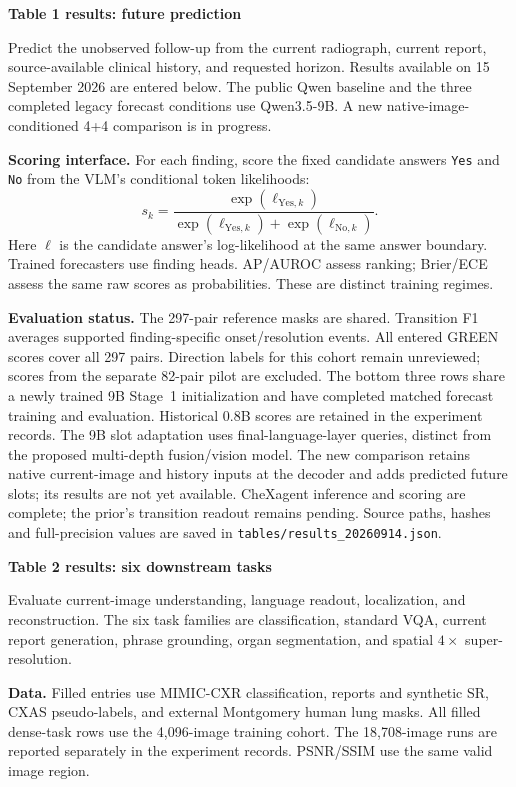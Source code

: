 \documentclass[10pt,letterpaper]{article}
\begin{document}
{\Large\bfseries Table 1 results: future prediction}\par
Predict the unobserved follow-up from the current radiograph, current report,
source-available clinical history, and requested horizon. Results available on
15 September 2026 are entered below. The public Qwen baseline and the three
completed legacy forecast conditions use Qwen3.5-9B. A new native-image-conditioned 4+4 comparison is in progress.



\textbf{Scoring interface.}
For each finding, score the fixed candidate answers \texttt{Yes} and \texttt{No}
from the VLM's conditional token likelihoods:
\[
 s_k=\frac{\exp(\ell_{\mathrm{Yes},k})}
 {\exp(\ell_{\mathrm{Yes},k})+\exp(\ell_{\mathrm{No},k})}.
\]
Here $\ell$ is the candidate answer's log-likelihood at the same answer boundary.
Trained forecasters use finding heads. AP/AUROC assess ranking; Brier/ECE assess
the same raw scores as probabilities. These are distinct training regimes.

\textbf{Evaluation status.}
The 297-pair reference masks are shared. Transition F1 averages supported
finding-specific onset/resolution events. All entered GREEN scores cover all
297 pairs. Direction labels for this cohort remain unreviewed; scores from the
separate 82-pair pilot are excluded. The bottom three rows share a newly trained
9B Stage~1 initialization and have completed matched forecast training and
evaluation. Historical 0.8B scores are retained in the experiment records.
The 9B slot adaptation
uses final-language-layer queries, distinct from the proposed multi-depth
fusion/vision model. The new comparison retains native current-image and history inputs at the decoder and adds predicted future slots; its results are not yet available. CheXagent inference and scoring are complete; the prior's
transition readout remains pending. Source paths, hashes and full-precision values are saved in
\texttt{tables/results\_20260914.json}.

\clearpage
{\Large\bfseries Table 2 results: six downstream tasks}\par
Evaluate current-image understanding, language readout, localization, and
reconstruction. The six task families are classification, standard VQA,
current report generation, phrase grounding, organ segmentation, and spatial
$4\times$ super-resolution.



\textbf{Data.}
Filled entries use MIMIC-CXR classification, reports and synthetic SR, CXAS
pseudo-labels, and external Montgomery human lung masks. All filled dense-task
rows use the 4,096-image training cohort. The 18,708-image runs are reported
separately in the experiment records. PSNR/SSIM use the same valid image region.
\end{document}
